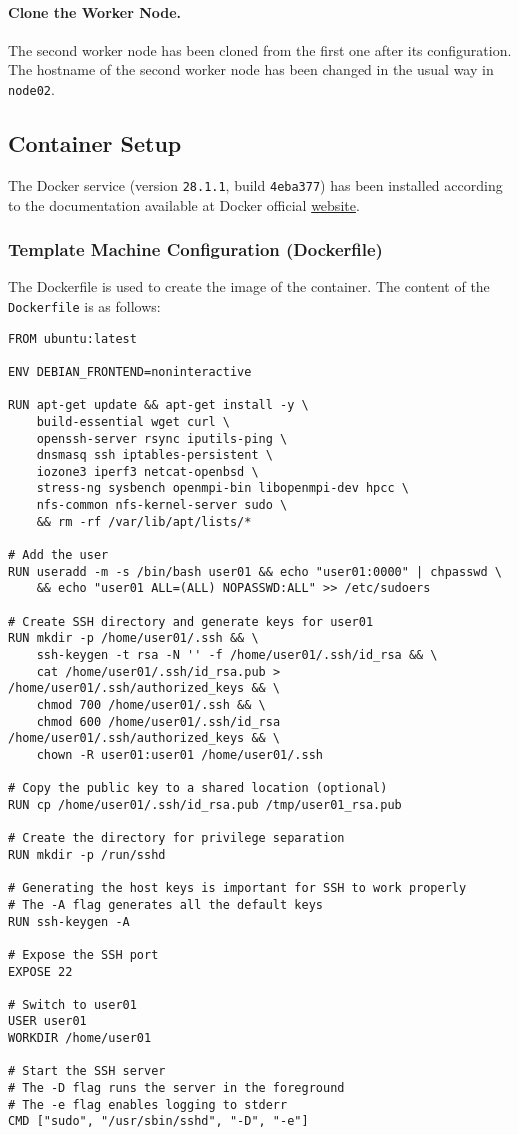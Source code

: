 \paragraph{Clone the Worker Node.}
The second worker node has been cloned from the first one after its configuration. The hostname of the second worker node has been changed in the usual way in \texttt{node02}. 

\subsection{Container Setup}

The Docker service (version \texttt{28.1.1}, build \texttt{4eba377}) has been installed according to the documentation available at Docker official \href{https://docs.docker.com/engine/install/ubuntu/#install-using-the-repository}{website}.

\subsubsection{Template Machine Configuration (Dockerfile)}

The Dockerfile is used to create the image of the container. The content of the \texttt{Dockerfile} is as follows:


\begin{verbatim}
FROM ubuntu:latest

ENV DEBIAN_FRONTEND=noninteractive

RUN apt-get update && apt-get install -y \
    build-essential wget curl \
    openssh-server rsync iputils-ping \
    dnsmasq ssh iptables-persistent \
    iozone3 iperf3 netcat-openbsd \
    stress-ng sysbench openmpi-bin libopenmpi-dev hpcc \
    nfs-common nfs-kernel-server sudo \
    && rm -rf /var/lib/apt/lists/*

# Add the user
RUN useradd -m -s /bin/bash user01 && echo "user01:0000" | chpasswd \
    && echo "user01 ALL=(ALL) NOPASSWD:ALL" >> /etc/sudoers

# Create SSH directory and generate keys for user01
RUN mkdir -p /home/user01/.ssh && \
    ssh-keygen -t rsa -N '' -f /home/user01/.ssh/id_rsa && \
    cat /home/user01/.ssh/id_rsa.pub > /home/user01/.ssh/authorized_keys && \
    chmod 700 /home/user01/.ssh && \
    chmod 600 /home/user01/.ssh/id_rsa /home/user01/.ssh/authorized_keys && \
    chown -R user01:user01 /home/user01/.ssh

# Copy the public key to a shared location (optional)
RUN cp /home/user01/.ssh/id_rsa.pub /tmp/user01_rsa.pub

# Create the directory for privilege separation
RUN mkdir -p /run/sshd

# Generating the host keys is important for SSH to work properly
# The -A flag generates all the default keys
RUN ssh-keygen -A

# Expose the SSH port
EXPOSE 22

# Switch to user01
USER user01
WORKDIR /home/user01

# Start the SSH server
# The -D flag runs the server in the foreground
# The -e flag enables logging to stderr
CMD ["sudo", "/usr/sbin/sshd", "-D", "-e"]
\end{verbatim}

